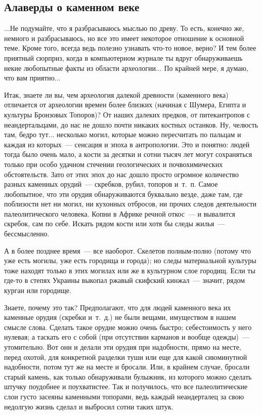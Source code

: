 \documentclass{scrbook}
\newcommand{\mdash}{~--- }
\newcommand{\essaysection}[1]{\subsection*{#1}\nopagebreak}
\begin{document}
\essaysection{Алаверды о каменном веке}

...Не подумайте, что я разбрасываюсь мыслью по древу. То есть, конечно же, немного и разбрасываюсь, но все это имеет некоторое отношение к основной теме. Кроме того, всегда ведь полезно узнавать что-то новое, верно? И тем более приятный сюрприз, когда в компьютерном журнале ты вдруг обнаруживаешь некие любопытные факты из области археологии... По крайней мере, я думаю, что вам приятно...

Итак, знаете ли вы, чем археология далекой древности (каменного века) отличается от археологии времен более близких (начиная с Шумера, Египта и культуры Бронзовых Топоров)? От наших далеких предков, от питекантропов с неандертальцами, до нас не дошло почти никаких костных останков. Ну, челюсть там, бедро тут... несколько могил, которые можно пересчитать по пальцам и каждая из которых{\mdash}сенсация и эпоха в антропологии. Это и понятно: людей тогда было очень мало, а кости за десятки и сотни тысяч лет могут сохраняться только при особо удачном стечении геологических и почвохимических обстоятельств. Зато от этих эпох до нас дошло просто огромное количество разных каменных орудий{\mdash}скребков, рубил, топоров и~т.~п. Самое любопытное, что эти орудия обнаруживаются буквально везде, даже там, где поблизости нет ни могил, ни кухонных отбросов, ни прочих следов деятельности палеолитического человека. Копни в Африке речной откос{\mdash}и вывалится скребок, сам по себе. Искать рядом кости или хотя бы следы жилья{\mdash}бессмысленно.

А в более позднее время{\mdash}все наоборот. Скелетов полным-полно (потому что уже есть могилы, уже есть городища и города); но следы материальной культуры тоже находят только в этих могилах или же в культурном слое городищ. Если ты где-то в степях Украины выкопал ржавый скифский кинжал{\mdash}значит, рядом курган или городище.

Знаете, почему это так? Предполагают, что для людей каменного века их каменные орудия (скребки и~т.~д.) не были вещами, имуществом в нашем смысле слова. Сделать такое орудие можно очень быстро; себестоимость у него нулевая; а таскать его с собой (при отсутствии карманов и вообще одежды){\mdash}утомительно. Вот они и делали эти орудия при надобности, прямо на месте, перед охотой, для конкретной разделки туши или еще для какой сиюминутной надобности, потом тут же на месте и бросали. Или, в крайнем случае, бросали старый камень, как только обнаруживали булыжник, из которого можно сделать штучку поудобнее и поухватистее. Так и получилось, что все палеолитические слои густо засеяны каменными топорами, ведь каждый неандерталец за свою недолгую жизнь сделал и выбросил сотни таких штук.
\end{document}
